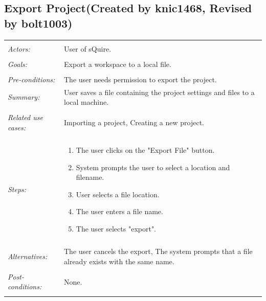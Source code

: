 \documentclass[11pt]{report}
\begin{document}
\subsection{Export Project(Created by knic1468, Revised by bolt1003)}
\begin{tabular}{ p{2cm} p{12cm} }
\hline
\\
\textit{Actors:} & User of sQuire.\\
\\
\textit{Goals:} & Export a workspace to a local file. \\
\\
\textit{Pre-conditions:} & The user needs permission to export the project. 
\\
\textit{Summary:} & User saves a file containing the project settings and files to a local machine. \\
\\
\textit{Related use cases:} & Importing a project, Creating a new project. \\
\\
\textit{Steps:} & \begin{enumerate}
 \item The user clicks on the "Export File" button. 
 \item System prompts the user to select a location and filename. 
 \item User selects a file location.
 \item The user enters a file name.
 \item The user selects "export". 
 \end{enumerate}\\
 \\
 \textit{Alternatives:} & The user cancels the export, The system prompts that a file already exists with the same name.\\
 \\
 \textit{Post-conditions:} & None. \\
 \\
\hline
\end{tabular}
\end{document}
